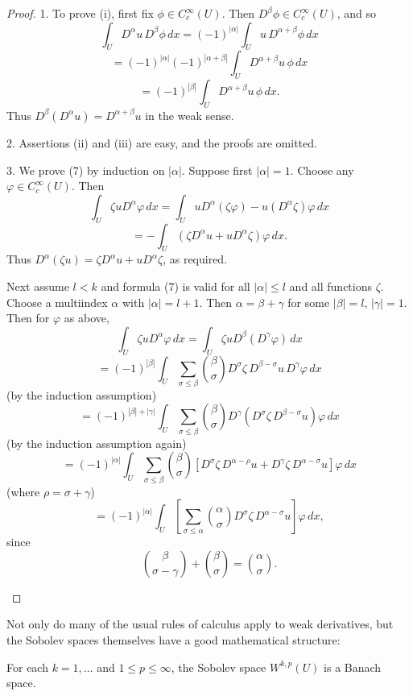 \begin{proof}
1. To prove (i), first fix $\phi \in C_c^{\infty}(U)$. Then $D^{\beta}\phi \in C_c^{\infty}(U)$, and so
$$\int_U D^{\alpha}u\, D^{\beta}\phi \, dx = (-1)^{|\alpha|} \int_U u\, D^{\alpha+\beta}\phi \, dx$$
$$= (-1)^{|\alpha|}(-1)^{|\alpha+\beta|} \int_U D^{\alpha+\beta}u\,\phi \, dx$$
$$= (-1)^{|\beta|} \int_U D^{\alpha+\beta}u\,\phi \, dx.$$
Thus $D^\beta(D^\alpha u) = D^{\alpha+\beta} u$ in the weak sense.

2. Assertions (ii) and (iii) are easy, and the proofs are omitted.

3. We prove (7) by induction on $|\alpha|$. Suppose first $|\alpha| = 1$. Choose any $\varphi \in C_c^\infty(U)$. Then
$$\int_U \zeta u D^\alpha \varphi\,dx = \int_U u D^\alpha(\zeta\varphi) - u(D^\alpha \zeta)\varphi\,dx$$
$$= -\int_U (\zeta D^\alpha u + uD^\alpha\zeta)\varphi\,dx.$$
Thus $D^\alpha(\zeta u) = \zeta D^\alpha u + uD^\alpha\zeta$, as required.

Next assume $l < k$ and formula (7) is valid for all $|\alpha| \le l$ and all functions $\zeta$. Choose a multiindex $\alpha$ with $|\alpha| = l + 1$. Then $\alpha = \beta + \gamma$ for some $|\beta| = l$, $|\gamma| = 1$. Then for $\varphi$ as above,
$$\int_U \zeta u D^\alpha \varphi\,dx = \int_U \zeta u D^\beta(D^\gamma\varphi)\,dx$$
$$= (-1)^{|\beta|} \int_U \sum_{\sigma \le \beta} \binom{\beta}{\sigma} D^\sigma\zeta\, D^{\beta-\sigma}u\, D^\gamma\varphi\,dx$$
(by the induction assumption)
$$= (-1)^{|\beta|+|\gamma|} \int_U \sum_{\sigma \le \beta} \binom{\beta}{\sigma} D^\gamma(D^\sigma \zeta\, D^{\beta-\sigma}u)\varphi\,dx$$
(by the induction assumption again)
$$= (-1)^{|\alpha|} \int_U \sum_{\sigma \le \beta} \binom{\beta}{\sigma} [D^\sigma\zeta\, D^{\alpha-\rho}u + D^\gamma\zeta\, D^{\alpha-\sigma}u]\varphi\,dx$$
(where $\rho = \sigma + \gamma$)
$$= (-1)^{|\alpha|} \int_U \left[\sum_{\sigma \le \alpha} \binom{\alpha}{\sigma} D^\sigma\zeta\, D^{\alpha-\sigma}u\right] \varphi\,dx,$$
since
$$\binom{\beta}{\sigma - \gamma} + \binom{\beta}{\sigma} = \binom{\alpha}{\sigma}.$$

\begin{figure}[h]\centering
\end{figure}
\end{proof}

Not only do many of the usual rules of calculus apply to weak derivatives, but the Sobolev spaces themselves have a good mathematical structure:

\begin{theorem}
\label{thm:sobolev-space-banach}
For each $k = 1, \ldots$ and $1 \le p \le \infty$, the Sobolev space $W^{k,p}(U)$ is a Banach space.
\end{theorem}


